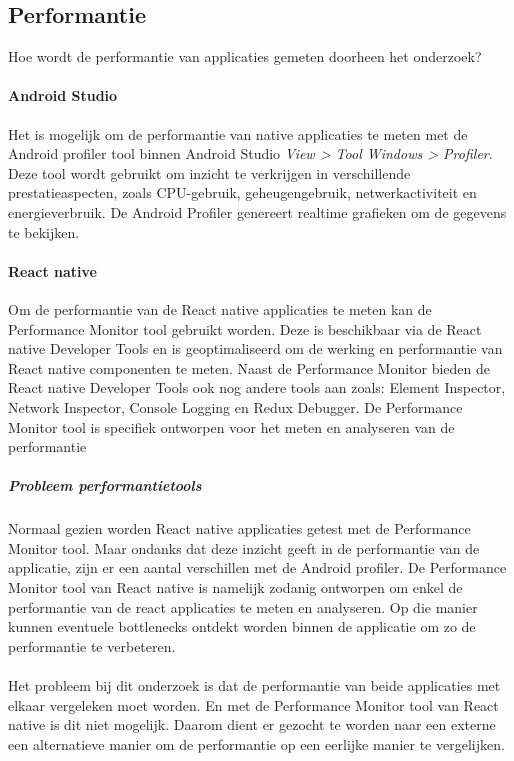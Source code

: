 \subsection{Performantie}
Hoe wordt de performantie van applicaties gemeten doorheen het onderzoek?

\paragraph{Android Studio}
Het is mogelijk om de performantie van native applicaties te meten met de Android profiler tool binnen Android Studio 
\textit{View > Tool Windows > Profiler}. Deze tool wordt gebruikt om inzicht te verkrijgen 
in verschillende prestatieaspecten, zoals CPU-gebruik, geheugengebruik, netwerkactiviteit en 
energieverbruik. De Android Profiler genereert realtime grafieken om de gegevens te bekijken. 

\paragraph{React native}
Om de performantie van de React native applicaties te meten kan de Performance 
Monitor tool gebruikt worden. Deze is beschikbaar via de React native Developer 
Tools en is geoptimaliseerd om de werking en performantie van React native 
componenten te meten. Naast de Performance Monitor bieden de React native Developer 
Tools ook nog andere tools aan zoals: Element Inspector, Network Inspector, Console 
Logging en Redux Debugger. De Performance Monitor tool is specifiek ontworpen 
voor het meten en analyseren van de performantie

\subparagraph{Probleem performantietools}
Normaal gezien worden React native applicaties getest met de Performance Monitor tool.
Maar ondanks dat deze inzicht geeft in de performantie van de applicatie, 
zijn er een aantal verschillen met de Android profiler. De Performance Monitor tool 
van React native is namelijk zodanig ontworpen om enkel de performantie van de 
react applicaties te meten en analyseren. Op die manier kunnen eventuele 
\gls{bottlenecks} ontdekt worden binnen de applicatie om zo de performantie te verbeteren.
\\\\
Het probleem bij dit onderzoek is dat de performantie van beide applicaties met 
elkaar vergeleken moet worden. En met de Performance Monitor tool van React 
native is dit niet mogelijk. Daarom dient er gezocht te worden naar een externe 
een alternatieve manier om de performantie op een eerlijke manier te vergelijken.

